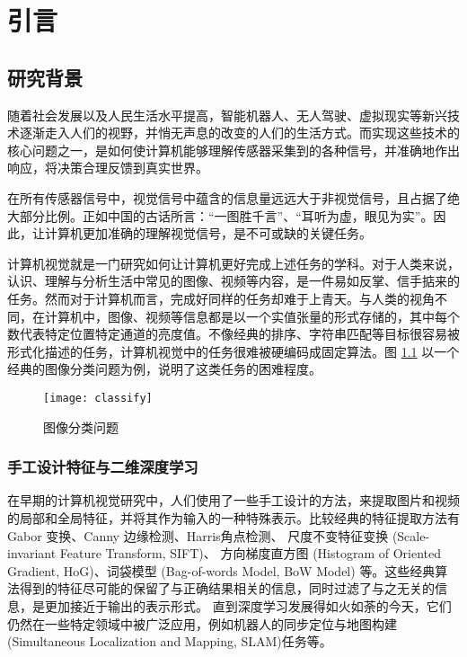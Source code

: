 \chapter{引言}
\label{cha:intro}
\section{研究背景}


随着社会发展以及人民生活水平提高，智能机器人、无人驾驶、虚拟现实等新兴技术逐渐走入人们的视野，并悄无声息的改变的人们的生活方式。而实现这些技术的核心问题之一，是如何使计算机能够理解传感器采集到的各种信号，并准确地作出响应，将决策合理反馈到真实世界。

在所有传感器信号中，视觉信号中蕴含的信息量远远大于非视觉信号，且占据了绝大部分比例。正如中国的古话所言：“一图胜千言”、“耳听为虚，眼见为实”。因此，让计算机更加准确的理解视觉信号，是不可或缺的关键任务。

计算机视觉就是一门研究如何让计算机更好完成上述任务的学科。对于人类来说，认识、理解与分析生活中常见的图像、视频等内容，是一件易如反掌、信手掂来的任务。然而对于计算机而言，完成好同样的任务却难于上青天。与人类的视角不同，在计算机中，图像、视频等信息都是以一个实值张量的形式存储的，其中每个数代表特定位置特定通道的亮度值。不像经典的排序、字符串匹配等目标很容易被形式化描述的任务，计算机视觉中的任务很难被硬编码成固定算法。图 \ref{fig:classify} 以一个经典的图像分类问题为例，说明了这类任务的困难程度。

\begin{figure}[H]
	\centering
	\texttt{[image: classify]}
	\caption{图像分类问题}
	\label{fig:classify}
\end{figure}

\subsection{手工设计特征与二维深度学习}
在早期的计算机视觉研究中，人们使用了一些手工设计的方法，来提取图片和视频的局部和全局特征，并将其作为输入的一种特殊表示。比较经典的特征提取方法有
Gabor 变换\cite{gabor}、Canny 边缘检测\cite{canny}、Harris角点检测\cite{harris}、
尺度不变特征变换 (Scale-invariant Feature Transform, SIFT)\cite{sift}、
方向梯度直方图 (Histogram of Oriented Gradient, HoG)\cite{hog, hog2}、词袋模型 (Bag-of-words Model, BoW Model) \cite{bow} 等。这些经典算法得到的特征尽可能的保留了与正确结果相关的信息，同时过滤了与之无关的信息，是更加接近于输出的表示形式。
直到深度学习发展得如火如荼的今天，它们仍然在一些特定领域中被广泛应用，例如机器人的同步定位与地图构建 (Simultaneous Localization and Mapping, SLAM)\cite{slam}任务等。

